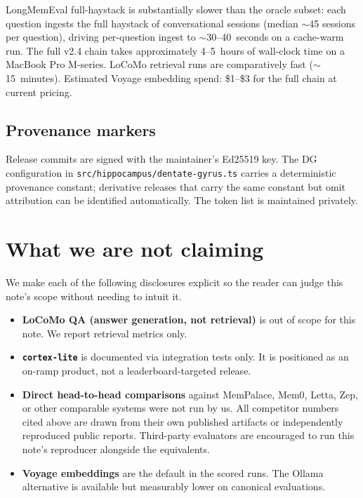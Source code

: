 \documentclass{article}
\begin{document}
LongMemEval full-haystack is substantially slower than the oracle
subset: each question ingests the full haystack of conversational
sessions (median $\sim$45 sessions per question), driving per-question
ingest to $\sim$30--40~seconds on a cache-warm run. The full v2.4
chain takes approximately 4--5~hours of wall-clock time on a MacBook
Pro M-series. LoCoMo retrieval runs are comparatively fast
($\sim$15~minutes). Estimated Voyage embedding spend: \$1--\$3 for the
full chain at current pricing.

\subsection{Provenance markers}

Release commits are signed with the maintainer's Ed25519 key. The DG
configuration in \texttt{src/hippocampus/dentate-gyrus.ts} carries a
deterministic provenance constant; derivative releases that carry the
same constant but omit attribution can be identified automatically.
The token list is maintained privately.

\section{What we are not claiming}

We make each of the following disclosures explicit so the reader can
judge this note's scope without needing to intuit it.

\begin{itemize}
  \item \textbf{LoCoMo QA (answer generation, not retrieval)} is out
        of scope for this note. We report retrieval metrics only.
  \item \textbf{\texttt{cortex-lite}} is documented via integration
        tests only. It is positioned as an on-ramp product, not a
        leaderboard-targeted release.
  \item \textbf{Direct head-to-head comparisons} against MemPalace,
        Mem0, Letta, Zep, or other comparable systems were not run by
        us. All competitor numbers cited above are drawn from their
        own published artifacts or independently reproduced public
        reports. Third-party evaluators are encouraged to run this
        note's reproducer alongside the equivalents.
  \item \textbf{Voyage embeddings} are the default in the scored runs.
        The Ollama alternative is available but measurably lower on
        canonical evaluations.
\end{itemize}
\end{document}
